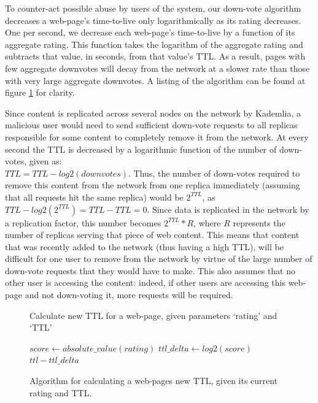 To counter-act possible abuse by users of the system, our down-vote algorithm decreases a web-page's time-to-live only 
logarithmically as its rating decreases. One per second, we decrease each web-page's time-to-live by a function of its
aggregate rating. This function takes the logarithm of the aggregate rating and subtracts that value, in seconds,
from that value's TTL. As a result, pages with few aggregate downvotes will decay from the network at a slower rate than
those with very large aggregate downvotes. A listing of the algorithm can be found at figure \ref{fig:downvotealgo} for clarity.

Since content is replicated across several nodes on the network by Kademlia, a malicious user would need to send sufficient
down-vote requests to all replicas responsible for some content to completely remove it from the network.
At every second the TTL is decreased by a logarithmic function of the number of down-votes, given as: \\
$ TTL = TTL - log2(downvotes) $.
Thus, the number of down-votes required to remove this content from the network from one replica immediately
(assuming that all requests hit the same replica) would be $ 2^{TTL} $, as $ TTL - log2(2^{TTL}) = TTL - TTL = 0 $.
Since data is replicated in the network by a replication factor, this number becomes $ 2^{TTL} * R $, where $R$
represents the number of replicas serving that piece of web content.
This means that content that was recently added to the network (thus having a high TTL), will be difficult for one
user to remove from the network by virtue of the large number of down-vote requests that they would have to make.
This also assumes that no other user is accessing the content: indeed, if other users are accessing this web-page and
not down-voting it, more requests will be required.

\begin{figure}
    \begin{algorithm}[H]
        \caption{Calculate new TTL for a web-page, given parameters `rating' and `TTL'}
        \begin{algorithmic}
        \ENDIF
        \STATE $ score \leftarrow absolute\_value(rating) $
        \STATE $ ttl\_delta \leftarrow log2(score) $
        \RETURN $ ttl - ttl\_delta $
        \end{algorithmic}
    \end{algorithm}
    \caption{Algorithm for calculating a web-pages new TTL, given its current rating and TTL.}
    \label{fig:downvotealgo}
\end{figure}

